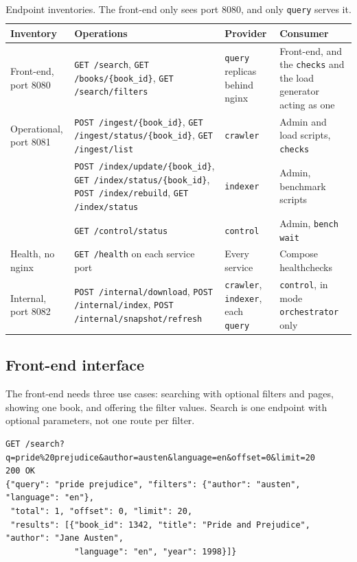 \documentclass[11pt,a4paper]{article}
\newcommand{\code}[1]{\nolinkurl{#1}}
\newcommand{\mode}[1]{\code{#1}}
\begin{document}
\begin{table}[ht]
\centering
\small
\caption{Endpoint inventories. The front-end only sees port 8080, and only \code{query} serves it.}
\label{tab:inventory}
\begin{tabularx}{\textwidth}{@{}L{2.1cm}L{4.65cm}L{2.15cm}Y@{}}
\toprule
Inventory & Operations & Provider & Consumer \\
\midrule
Front-end, port 8080 & \code{GET /search}, \code{GET /books/{book_id}}, \code{GET /search/filters} & \code{query} replicas behind nginx & Front-end, and the \code{checks} and the load generator acting as one \\
Operational, port 8081 & \code{POST /ingest/{book_id}}, \code{GET /ingest/status/{book_id}}, \code{GET /ingest/list} & \code{crawler} & Admin and load scripts, \code{checks} \\
 & \code{POST /index/update/{book_id}}, \code{GET /index/status/{book_id}}, \code{POST /index/rebuild}, \code{GET /index/status} & \code{indexer} & Admin, benchmark scripts \\
 & \code{GET /control/status} & \code{control} & Admin, \code{bench wait} \\
Health, no nginx & \code{GET /health} on each service port & Every service & Compose healthchecks \\
Internal, port 8082 & \code{POST /internal/download}, \code{POST /internal/index}, \code{POST /internal/snapshot/refresh} & \code{crawler}, \code{indexer}, each \code{query} & \code{control}, in mode \mode{orchestrator} only \\
\bottomrule
\end{tabularx}
\end{table}

\subsection{Front-end interface}

The front-end needs three use cases: searching with optional filters and pages, showing one book, and offering the
filter values. Search is one endpoint with optional parameters, not one route per filter.

\begin{lstlisting}
GET /search?q=pride%20prejudice&author=austen&language=en&offset=0&limit=20
200 OK
{"query": "pride prejudice", "filters": {"author": "austen", "language": "en"},
 "total": 1, "offset": 0, "limit": 20,
 "results": [{"book_id": 1342, "title": "Pride and Prejudice", "author": "Jane Austen",
              "language": "en", "year": 1998}]}
\end{lstlisting}
\end{document}
